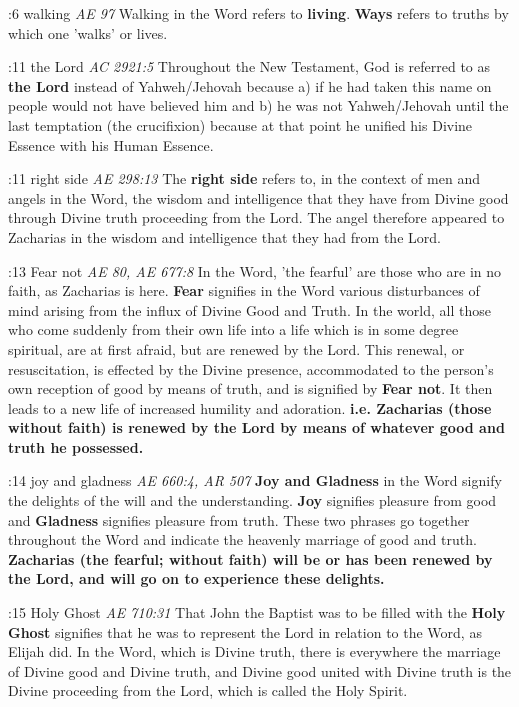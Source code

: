 
:6 {walking}
{\it AE 97} Walking in the Word refers to {\bf living}. {\bf Ways} refers to truths by which one 'walks' or lives.

:11 {the Lord}
{\it AC 2921:5} Throughout the New Testament, God is referred to as {\bf the Lord} instead of Yahweh/Jehovah because a) if he had taken this name on people would not have believed him and b) he was not Yahweh/Jehovah until the last temptation (the crucifixion) because at that point he unified his Divine Essence with his Human Essence.

:11 {right side}
{\it AE 298:13} The {\bf right side} refers to, in the context of men and angels in the Word, the wisdom and intelligence that they have from Divine good through Divine truth proceeding from the Lord. The angel therefore appeared to Zacharias in the wisdom and intelligence that they had from the Lord.

:13 {Fear not}
{\it AE 80, AE 677:8} In the Word, 'the fearful' are those who are in no faith, as Zacharias is here. {\bf Fear} signifies in the Word various disturbances of mind arising from the influx of Divine Good and Truth. In the world, all those who come suddenly from their own life into a life which is in some degree spiritual, are at first afraid, but are renewed by the Lord. This renewal, or resuscitation, is effected by the Divine presence, accommodated to the person's own reception of good by means of truth, and is signified by {\bf Fear not}. It then leads to a new life of increased humility and adoration. {\bf i.e. Zacharias (those without faith) is renewed by the Lord by means of whatever good and truth he possessed.}

:14 {joy and gladness}
{\it AE 660:4, AR 507} {\bf Joy and Gladness} in the Word signify the delights of the will and the understanding. {\bf Joy} signifies pleasure from good and {\bf Gladness} signifies pleasure from truth. These two phrases go together throughout the Word and indicate the heavenly marriage of good and truth. {\bf Zacharias (the fearful; without faith) will be or has been renewed by the Lord, and will go on to experience these delights.}

:15 {Holy Ghost}
{\it AE 710:31} That John the Baptist was to be filled with the {\bf Holy Ghost} signifies that he was to represent the Lord in relation to the Word, as Elijah did. In the Word, which is Divine truth, there is everywhere the marriage of Divine good and Divine truth, and Divine good united with Divine truth is the Divine proceeding from the Lord, which is called the Holy Spirit.

